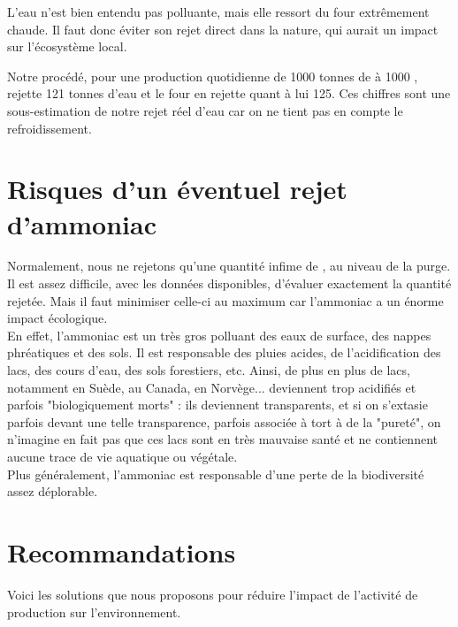 \documentclass[10pt, a4paper, oneside]{scrartcl}
\begin{document}
L'eau n'est bien entendu pas polluante, mais elle ressort du four extrêmement chaude. Il faut donc éviter son rejet direct dans la nature, qui aurait un impact sur l'écosystème local.

Notre procédé, pour une production quotidienne de 1000 tonnes de  à 1000 \kelvin, rejette 121 tonnes d'eau et le four en rejette quant à lui 125. Ces chiffres sont une sous-estimation de notre rejet réel d'eau car on ne tient pas en compte le refroidissement.

\section{Risques d'un éventuel rejet d'ammoniac \cite{ammo1} \cite{ammo2} \cite{ammo3}}
Normalement, nous ne rejetons qu'une quantité infime de , au niveau de la purge. Il est assez difficile, avec les données disponibles, d'évaluer exactement la quantité rejetée. Mais il faut minimiser celle-ci au maximum car l'ammoniac a un énorme impact écologique.
\\

En effet, l'ammoniac est un très gros polluant des eaux de surface, des nappes phréatiques et des sols. Il est responsable des pluies acides, de l'acidification des lacs, des cours d'eau, des sols forestiers, etc. Ainsi, de plus en plus de lacs, notamment en Suède, au Canada, en Norvège... deviennent trop acidifiés et parfois "biologiquement morts" : ils deviennent transparents, et si on s'extasie parfois devant une telle transparence, parfois associée à tort à de la "pureté", on n'imagine en fait pas que ces lacs sont en très mauvaise santé et ne contiennent aucune trace de vie aquatique ou végétale.
\\

Plus généralement, l'ammoniac est responsable d'une perte de la biodiversité assez déplorable.

\section{Recommandations \cite{evaleco} \cite{lossprev}}
Voici les solutions que nous proposons pour réduire l'impact de l'activité de production sur l'environnement.
\end{document}
